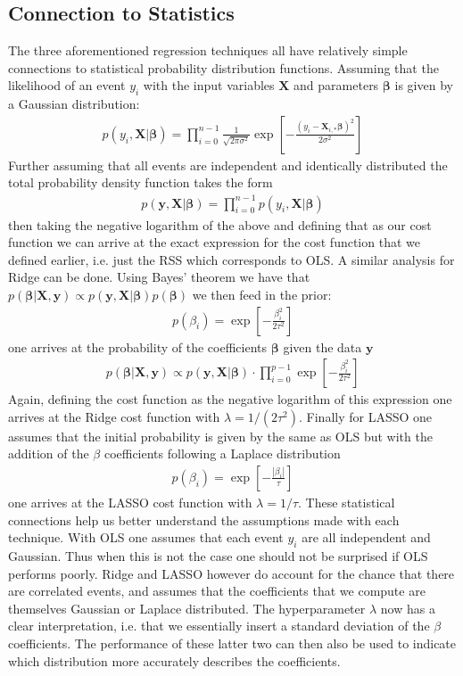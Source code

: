 \documentclass[%
reprint,
amsmath,amssymb,
aps,
pra,
]{revtex4-2}
\begin{document}
\subsection{Connection to Statistics}
The three aforementioned regression techniques all have relatively simple connections to statistical probability distribution functions. Assuming that the likelihood of an event $y_i$ with the input variables $\bm X$ and parameters $\bm\beta$ is given by a Gaussian distribution:
\begin{align}
	p(y_i,\bm X|\bm\beta)=\prod_{i=0}^{n-1}\frac{1}{\sqrt{2\pi\sigma^2}}\exp\left[-\frac{(y_i-\bm X_{i,*}\bm\beta)^2}{2\sigma^2}\right]
\end{align}
Further assuming that all events are independent and identically distributed the total probability density function takes the form
\begin{align}
	p(\bm y,\bm X|\bm\beta)=\prod_{i=0}^{n-1}p(y_i,\bm X|\bm\beta)
\end{align}
then taking the negative logarithm of the above and defining that as our cost function we can arrive at the exact expression for the cost function that we defined earlier, i.e. just the RSS which corresponds to OLS. A similar analysis for Ridge can be done. Using Bayes' theorem we have that $p(\bm\beta|\bm X,\bm y)\propto p(\bm y,\bm X|\bm\beta)p(\bm\beta)$ we then feed in the prior:
\begin{align}
	p(\beta_i)=\exp\left[-\frac{\beta_i^2}{2\tau^2}\right]
\end{align}
one arrives at the probability of the coefficients $\bm\beta$ given the data $\bm y$
\begin{align}
	p(\bm\beta|\bm X,\bm y)\propto p(\bm y,\bm X|\bm\beta)\cdot\prod_{i=0}^{p-1}\exp\left[-\frac{\beta_i^2}{2\tau^2}\right]
\end{align}
Again, defining the cost function as the negative logarithm of this expression one arrives at the Ridge cost function with $\lambda=1/(2\tau^2)$. Finally for LASSO one assumes that the initial probability is given by the same as OLS but with the addition of the $\beta$ coefficients following a Laplace distribution
\begin{align}
	p(\beta_i)=\exp\left[-\frac{|\beta_i|}{\tau}\right]
\end{align}
one arrives at the LASSO cost function with $\lambda=1/\tau$. These statistical connections help us better understand the assumptions made with each technique. With OLS one assumes that each event $y_i$ are all independent and Gaussian. Thus when this is not the case one should not be surprised if OLS performs poorly. Ridge and LASSO however do account for the chance that there are correlated events, and assumes that the coefficients that we compute are themselves Gaussian or Laplace distributed. The hyperparameter $\lambda$ now has a clear interpretation, i.e. that we essentially insert a standard deviation of the $\beta$ coefficients. The performance of these latter two can then also be used to indicate which distribution more accurately describes the coefficients.
\end{document}
